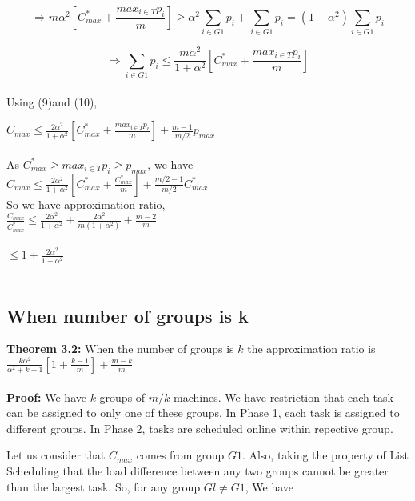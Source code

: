 \documentclass[10pt, conference, compsocconf]{IEEEtran}
\begin{document}
 
\begin{equation}\nonumber
\Rightarrow m\alpha^{2}[C_{max}^{*}+ \frac{{max_{i \in T}}{p_{i}}}{m}] \geq  \alpha^{2} \sum_{i \in G1 }^{}{{p_{i}}} + \sum_{i \in G1 }^{}{{p_{i}}} = (1+\alpha^{2}) \sum_{i \in G1 }^{}{{p_{i}}} \end{equation}

\begin{equation}
\Rightarrow\sum_{i \in G1 }^{}{{p_{i}}} \leq \frac{m\alpha^{2}}{1+ \alpha^{2}}[C_{max}^{*}+ \frac{{max_{i \in T}}{p_{i}}}{m}] 
\end{equation}
\\
Using (9)and (10),

 $C_{max} \leq \frac{2\alpha^{2}}{1+ \alpha^{2}}[C_{max}^{*}+ \frac{{max_{i \in T}}{p_{i}}}{m}]  + {\frac{m-1}{m/2}} p_{max} $ \\
\\
 As $C_{max}^{*}\geq {{max_{i \in T}}{p_{i}}}\geq p_{max}$, we have\\
 
 $C_{max} \leq \frac{2\alpha^{2}}{1+ \alpha^{2}}[C_{max}^{*}+ \frac{C_{max}^{*}}{m}] + {\frac{m/2-1}{m/2}} C_{max}^{*} $\\
 
 So we have approximation ratio,\\
 $\frac{C_{max}}{C_{max}^{*}} \leq \frac{2\alpha^{2}}{1+\alpha^{2}} + \frac{2\alpha^{2}}{m{(1+\alpha^{2})}}  + \frac{m-2}{m}$\\
 \\
$ \leq 1 + \frac{2\alpha^{2}}{1+\alpha^{2}} $\\
\\
\subsection{When number of groups is k}
\textbf{Theorem 3.2:} When the number of groups is $k$ the approximation ratio is $  \frac{k\alpha^{2}}{\alpha^{2}+k-1}[1+ {\frac{k-1}{m}} ]+ {\frac{m-k}{m}}   $ \\
\\
\textbf{Proof:} 
  We have $k$ groups of $m/k$ machines. We have restriction that each task can be assigned to only one of these groups. In Phase 1, each task is assigned to different groups. In Phase 2, tasks are scheduled online within repective group.

Let us consider  that $ C_{max}$ comes from group  $G1$. Also, taking the property of List Scheduling that the load difference between any two groups cannot be greater than the largest task. So, for any group $Gl \neq G1$, We have\\
\end{document}
